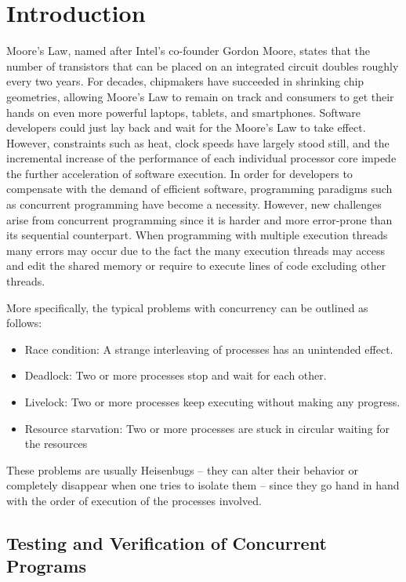 \chapter{Introduction}

Moore's Law, named after Intel's co-founder Gordon Moore, states that the number of transistors that can be placed on an integrated circuit doubles
roughly every two years. For decades, chipmakers have succeeded in shrinking chip geometries, allowing Moore's Law to remain on track and consumers to 
get their hands on even more powerful laptops, tablets, and smartphones. Software developers could just lay back and wait for the Moore's Law to take effect.
However, constraints such as heat, clock speeds have largely stood still, and the incremental increase of the performance of each individual 
processor core impede the further acceleration of software execution. In order for developers to compensate with the demand of efficient software, programming paradigms such
as concurrent programming have become a necessity. However, new challenges arise from concurrent programming since it is harder and more
error-prone than its sequential counterpart. When programming with multiple execution threads many errors may occur due to the fact the many execution threads 
may access and edit the shared memory or require to execute lines of code excluding other threads.

More specifically, the typical problems with concurrency can be outlined as follows:
\begin{itemize}
\item Race condition: A strange interleaving of processes has an unintended effect.
\item Deadlock: Two or more processes stop and wait for each other.
\item Livelock: Two or more processes keep executing without making any progress.
\item Resource starvation: Two or more processes are stuck in circular waiting for the resources
\end{itemize}

These problems are usually Heisenbugs \cite{Musu08} – they can alter their behavior or completely
disappear when one tries to isolate them – since they go hand in hand with the order of
execution of the processes involved.

\section{Testing and Verification of Concurrent Programs}

